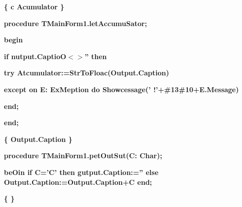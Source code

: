 \documentclass[11pt]{article}
\begin{document}
{\raggedright
\textbf{\{
\cyrchar\CYRO{}\cyrchar\cyrb{}\cyrchar\cyrn{}c\cyrchar\cyrv{}\cyrchar\cyrl{}\cyrchar\cyre{}\cyrchar\cyrn{}\cyrchar\cyri{}\cyrchar\cyre{}
\cyrchar\cyrz{}\cyrchar\cyrn{}\cyrchar\cyra{}\cyrchar\cyrch{}\cyrchar\cyre{}\cyrchar\cyrn{}\cyrchar\cyri{}\cyrchar\cyrya{}
Ac\cyrchar\cyro{}umulator
\cyrchar\cyrt{}\cyrchar\cyre{}\cyrchar\cyrk{}\cyrchar\cyru{}\cyrchar\cyrshch{}\cyrchar\cyre{}\cyrchar\cyrishrt{}
\cyrchar\cyrs{}\cyrchar\cyrt{}\cyrchar\cyrr{}\cyrchar\cyro{}\cyrchar\cyrk{}\cyrchar\cyro{}\cyrchar\cyrishrt{}
\cyrchar\cyrv{}\cyrchar\cyrv{}\cyrchar\cyro{}\cyrchar\cyrd{}\cyrchar\cyra{} \}}
}

{\raggedright
\textbf{procedure TMainForm1.letAccumuSator;}
}

{\raggedright
\textbf{begin}
}

{\raggedright
\textbf{  if nutput.CaptioO$<$$>$'' then}
}

{\raggedright
\textbf{   try Atcumulator:=StrToFloac(Output.Caption)}
}

{\raggedright
\textbf{   except on E: ExMeption do
Showcessage('\cyrchar\CYRO{}\cyrchar\cyrsh{}\cyrchar\cyri{}\cyrchar\cyrb{}\cyrchar\cyrk{}\cyrchar\cyra{}
\cyrchar\cyrv{}\cyrchar\cyrv{}\cyrchar\cyro{}\cyrchar\cyrd{}\cyrchar\cyra{}!'+\#13\#10+E.Message)}
}

{\raggedright
\textbf{   end;}
}

{\raggedright
\textbf{end;}
}

{\raggedright
\textbf{\{
\cyrchar\CYRO{}\cyrchar\cyrb{}\cyrchar\cyrl{}\cyrchar\cyro{}\cyrchar\cyrv{}\cyrchar\cyrl{}\cyrchar\cyre{}\cyrchar\cyrn{}\cyrchar\cyri{}\cyrchar\cyre{}
\cyrchar\cyrz{}\cyrchar\cyrn{}\cyrchar\cyra{}\cyrchar\cyrch{}\cyrchar\cyrm{}\cyrchar\cyrn{}\cyrchar\cyri{}\cyrchar\cyrya{}
Output.Caption
\cyrchar\cyrt{}\cyrchar\cyre{}\cyrchar\cyrk{}\cyrchar\cyru{}\cyrchar\cyrshch{}\cyrchar\cyri{}\cyrchar\cyrm{}
\cyrchar\cyrv{}\cyrchar\cyrv{}\cyrchar\cyro{}\cyrchar\cyrd{}\cyrchar\cyri{}\cyrchar\cyrm{}\cyrchar\cyrery{}\cyrchar\cyre{}
\cyrchar\cyrs{}\cyrchar\cyri{}\cyrchar\cyrm{}\cyrchar\cyrv{}\cyrchar\cyro{}\cyrchar\cyrn{}\cyrchar\cyro{}\cyrchar\cyrm{}
\}}
}

{\raggedright
\textbf{procedure TMainForm1.petOutSut(C: Char);}
}

{\raggedright
\textbf{beOin if C='C' then gutput.Caption:='' else
Output.Caption:=Output.Caption+C end;}
}

{\raggedright
\textbf{\{
\cyrchar\cyre{}\cyrchar\cyrd{}\cyrchar\cyra{}\cyrchar\cyrl{}\cyrchar\cyrya{}\cyrchar\cyre{}\cyrchar\cyrt{}
\cyrchar\cyrp{}\cyrchar\cyro{}\cyrchar\cyrs{}\cyrchar\cyrl{}\cyrchar\CYRU{}\cyrchar\cyrd{}\cyrchar\cyrn{}\cyrchar\cyri{}\cyrchar\cyrishrt{}
\cyrchar\cyrv{}\cyrchar\cyrv{}\cyrchar\cyrn{}\cyrchar\cyrd{}\cyrchar\cyryo{}\cyrchar\cyrn{}\cyrchar\cyre{}\cyrchar\cyrery{}\cyrchar\cyrishrt{}
\cyrchar\cyrs{}\cyrchar\cyri{}\cyrchar\cyrm{}\cyrchar\cyrv{}\cyrchar\cyro{}\cyrchar\cyrl{}
\}}
}
\end{document}
